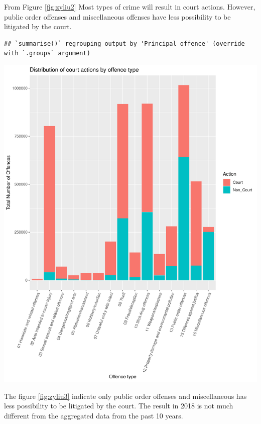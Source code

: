 \documentclass[11pt,a4paper,]{article}
\let\origfigure\figure
\let\endorigfigure\endfigure
\renewenvironment{figure}[1][2] {
\expandafter\origfigure\expandafter[H]
} {
\endorigfigure
}
\begin{document}
From Figure \ref{fig:zyliu2} Most types of crime will result in court actions. However, public order offenses and miscellaneous offenses have less possibility to be litigated by the court.

\begin{verbatim}
## `summarise()` regrouping output by 'Principal offence' (override with `.groups` argument)
\end{verbatim}

\begin{figure}

{\centering \includegraphics{ETC5513-Assignment4_files/figure-latex/zyliu2-1} 

}

\caption{Distribution of court actions by offence type}\label{fig:zyliu2}
\end{figure}

The figure \ref{fig:zyliu3} indicate only public order offenses and miscellaneous has less possibility to be litigated by the court. The result in 2018 is not much different from the aggregated data from the past 10 years.
\end{document}
